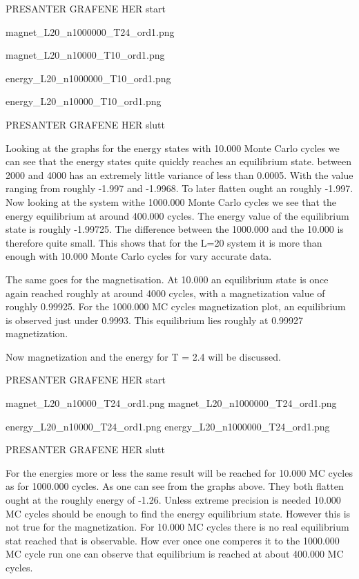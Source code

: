 \documentclass{article}
\begin{document}
PRESANTER GRAFENE HER start



magnet_L20_n1000000_T24_ord1.png

magnet_L20_n10000_T10_ord1.png

energy_L20_n1000000_T10_ord1.png

energy_L20_n10000_T10_ord1.png

PRESANTER GRAFENE HER slutt

Looking at the graphs for the energy states with 10.000 Monte Carlo cycles we can see that the energy states quite quickly reaches an equilibrium state. between 2000 and 4000 has an extremely little variance of less than 0.0005. With the value ranging from roughly -1.997 and -1.9968. To later flatten ought an roughly -1.997. Now looking at the system withe 1000.000 Monte Carlo cycles we see that the energy equilibrium at around 400.000 cycles. The energy value of the equilibrium state is roughly -1.99725. The difference between the 1000.000 and the 10.000 is therefore quite small. This shows that for the L=20 system it is more than enough with 10.000 Monte Carlo cycles for vary accurate data.

The same goes for the magnetisation. At 10.000 an equilibrium state is once again reached roughly at around 4000 cycles, with a magnetization value of roughly 0.99925. For the 1000.000 MC cycles magnetization plot, an equilibrium is observed just under 0.9993. This equilibrium lies roughly at 0.99927 magnetization.

Now magnetization and the energy for T = 2.4 will be discussed.

PRESANTER GRAFENE HER start

magnet_L20_n10000_T24_ord1.png
magnet_L20_n1000000_T24_ord1.png

energy_L20_n10000_T24_ord1.png
energy_L20_n1000000_T24_ord1.png

PRESANTER GRAFENE HER slutt

For the energies more or less the same result will be reached for 10.000 MC cycles as for 1000.000 cycles. As one can see from the graphs above. They both flatten ought at the roughly energy of -1.26. Unless extreme precision is needed 10.000 MC cycles should be enough to find the energy equilibrium state.
\newline
\newline
However this is not true for the magnetization. For 10.000 MC cycles there is no real equilibrium stat reached that is observable. How ever once one comperes it to the 1000.000 MC cycle run one can observe that equilibrium is reached at about 400.000 MC cycles.
\end{document}
